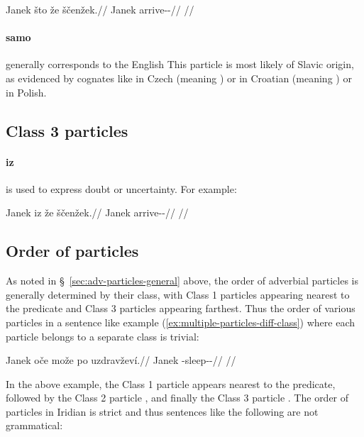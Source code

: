 \pex
\begingl
	\gla Janek što že ščenžek.//
	\glb Janek \Aff{} \Pfv{} arrive-\Av{}-\Pf{}//
	\glft {}//
\endgl
\xe

\paragraph{samo}  generally corresponds to the English 
This particle is most likely of Slavic origin, as evidenced by cognates like
 in Czech (meaning ) or in Croatian (meaning
) or  in Polish.


\subsection{Class 3 particles}\label{sec:class3-particles}

\paragraph{iz}  is used to express doubt or uncertainty. For example:

\pex
\begingl
	\gla Janek iz že ščenžek.//
	\glb Janek \Dub{} \Pfv{} arrive-\Av{}-\Pf{}//
	\glft {}//
\endgl
\xe

\subsection{Order of particles}\label{sec:order-of-particles}

As noted in \S~\ref{sec:adv-particles-general} above, the order of adverbial
particles is generally determined by their class, with Class 1 particles
appearing nearest to the predicate and Class 3 particles appearing farthest.
Thus the order of various particles in a sentence like example
(\ref{ex:multiple-particles-diff-class}) where each particle belongs to a
separate class is trivial:

\pex\label{ex:multiple-particles-diff-class}
\begingl
	\gla Janek oče može po uzdravževí.//
	\glb Janek \Mir{} \Add{} \Ipfv{} \Refl{}-sleep-\Av{}-\Cont{}//
	\glft {}//
\endgl
\xe

In the above example, the Class 1 particle  appears nearest to the
predicate, followed by the Class 2 particle , and finally the Class 3
particle . The order of particles in Iridian is strict and thus
sentences like the following are not grammatical:

